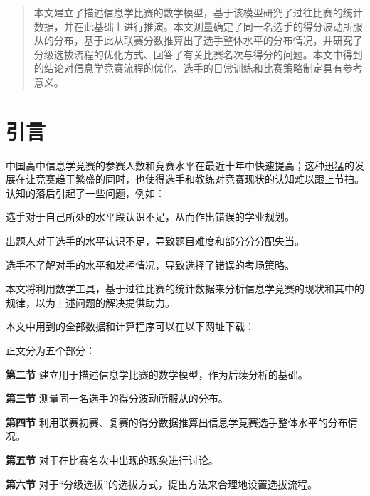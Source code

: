 \begin{abstract}
    本文建立了描述信息学比赛的数学模型，基于该模型研究了过往比赛的统计数据，并在此基础上进行推演。本文测量确定了同一名选手的得分波动所服从的分布，基于此从联赛分数推算出了选手整体水平的分布情况，并研究了分级选拔流程的优化方式、回答了有关比赛名次与得分的问题。本文中得到的结论对信息学竞赛流程的优化、选手的日常训练和比赛策略制定具有参考意义。
\end{abstract}

\section{引言}

    中国高中信息学竞赛的参赛人数和竞赛水平在最近十年中快速提高；这种迅猛的发展在让竞赛趋于繁盛的同时，也使得选手和教练对竞赛现状的认知难以跟上节拍。认知的落后引起了一些问题，例如：
    \begin{asparaitem}
        \item {选手对于自己所处的水平段认识不足，从而作出错误的学业规划。}
        \item {出题人对于选手的水平认识不足，导致题目难度和部分分分配失当。}
        \item {选手不了解对手的水平和发挥情况，导致选择了错误的考场策略。}
    \end{asparaitem}

    本文将利用数学工具，基于过往比赛的统计数据来分析信息学竞赛的现状和其中的规律，以为上述问题的解决提供助力。

    \vspace{1.5ex}

    \begin{samepage}
        本文中用到的全部数据和计算程序可以在以下网址下载：\nobreak
        \begin{compactitem}
            \item {}
            \item {}
        \end{compactitem}
    \end{samepage}

    \vspace{1.5ex}

    正文分为五个部分：

    \begin{asparaenum}
        \item [\textbf{第二节}]{建立用于描述信息学比赛的数学模型，作为后续分析的基础。}
        \item [\textbf{第三节}]{测量同一名选手的得分波动所服从的分布。}
        \item [\textbf{第四节}]{利用联赛初赛、复赛的得分数据推算出信息学竞赛选手整体水平的分布情况。}
        \item [\textbf{第五节}]{对于在比赛名次中出现的现象进行讨论。}
        \item [\textbf{第六节}]{对于“分级选拔”的选拔方式，提出方法来合理地设置选拔流程。}
    \end{asparaenum}

